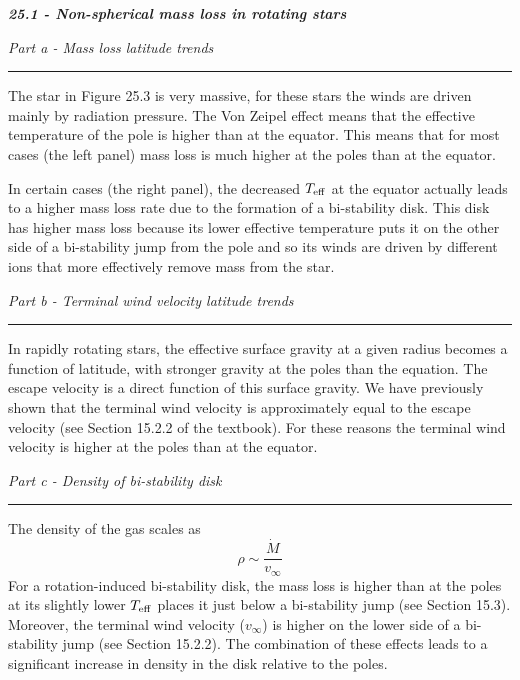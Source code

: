 \documentclass[12pt, letterpaper, twoside]{article}
\newcommand{\question}[1]{{\noindent \it #1}}
\newcommand{\answer}[1]{
    \par\noindent\rule{\textwidth}{0.4pt}#1\vspace{0.5cm}
}
\begin{document}
\question{\textbf{25.1 - Non-spherical mass loss in rotating stars}}

\question{Part a - Mass loss latitude trends}
\answer{
    The star in Figure 25.3 is very massive, for these stars the winds are driven mainly by radiation pressure. The Von Zeipel effect means that the effective temperature of the pole is higher than at the equator. This means that for most cases (the left panel) mass loss is much higher at the poles than at the equator.

    In certain cases (the right panel), the decreased $T_{\rm eff}$ at the equator actually leads to a higher mass loss rate due to the formation of a bi-stability disk. This disk has higher mass loss because its lower effective temperature puts it on the other side of a bi-stability jump from the pole and so its winds are driven by different ions that more effectively remove mass from the star.
}

\question{Part b - Terminal wind velocity latitude trends}
\answer{
    In rapidly rotating stars, the effective surface gravity at a given radius becomes a function of latitude, with stronger gravity at the poles than the equation. The escape velocity is a direct function of this surface gravity. We have previously shown that the terminal wind velocity is approximately equal to the escape velocity (see Section 15.2.2 of the textbook). For these reasons the terminal wind velocity is higher at the poles than at the equator.
}

\question{Part c - Density of bi-stability disk}
\answer{
    The density of the gas scales as
    \begin{equation}
        \rho \sim \frac{\dot{M}}{v_{\infty}}
    \end{equation}
    For a rotation-induced bi-stability disk, the mass loss is higher than at the poles at its slightly lower $T_{\rm eff}$ places it just below a bi-stability jump (see Section 15.3). Moreover, the terminal wind velocity ($v_\infty$) is higher on the lower side of a bi-stability jump (see Section 15.2.2). The combination of these effects leads to a significant increase in density in the disk relative to the poles.
}
\end{document}

